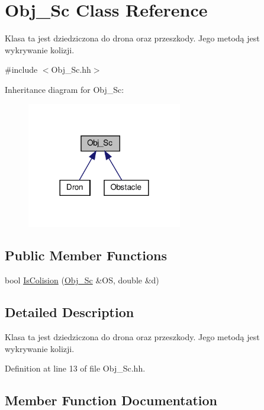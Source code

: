 \hypertarget{class_obj___sc}{}\section{Obj\+\_\+\+Sc Class Reference}
\label{class_obj___sc}


Klasa ta jest dziedziczona do drona oraz przeszkody. Jego metodą jest wykrywanie kolizji.  




{\ttfamily \#include $<$Obj\+\_\+\+Sc.\+hh$>$}



Inheritance diagram for Obj\+\_\+\+Sc\+:
\nopagebreak
\begin{figure}[H]
\begin{center}
\leavevmode
\includegraphics[width=192pt]{class_obj___sc__inherit__graph}
\end{center}
\end{figure}
\subsection*{Public Member Functions}
\begin{DoxyCompactItemize}
\item 
bool \hyperlink{class_obj___sc_ab908a242bc8ba6a409477314f23ce2d6}{Is\+Colision} (\hyperlink{class_obj___sc}{Obj\+\_\+\+Sc} \&OS, double \&d)
\end{DoxyCompactItemize}


\subsection{Detailed Description}
Klasa ta jest dziedziczona do drona oraz przeszkody. Jego metodą jest wykrywanie kolizji. 

Definition at line 13 of file Obj\+\_\+\+Sc.\+hh.



\subsection{Member Function Documentation}
\mbox{\label{class_obj___sc_ab908a242bc8ba6a409477314f23ce2d6}} 
